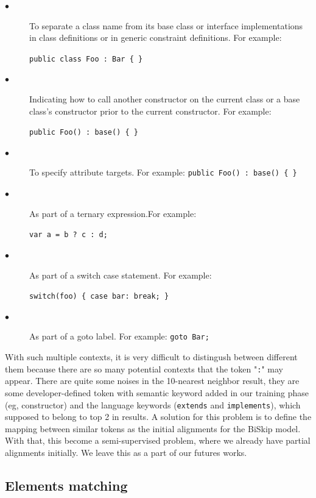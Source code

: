 \begin{description}
	\item [$\bullet$] To separate a class name from its base class or interface implementations in class definitions or in generic constraint definitions. For example: 
	
	\texttt{public class Foo : Bar \{ \}}
	\item [$\bullet$] Indicating how to call another constructor on the current class or a base class's constructor prior to the current constructor. For example: 
	
	\texttt{public Foo() : base() \{ \}}
	\item [$\bullet$] To specify attribute targets. For example: \texttt{public Foo() : base() \{ \}}
	\item [$\bullet$] As part of a ternary expression.For example:
	
 	\texttt{var a = b ? c : d;}
	\item [$\bullet$] As part of a switch case statement. For example:
	
	 \texttt{switch(foo) \{ case bar: break; \}}
	\item [$\bullet$] As part of a goto label. For example:
	\texttt{goto Bar;}

\end{description}

With such multiple contexts, it is very difficult to distingush between different them because there are so many potential contexts that the token "\texttt{:}" may appear. There are quite some noises in the 10-nearest neighbor result, they are some developer-defined token with semantic keyword added in our training phase (eg, constructor) and the language keywords (\texttt{extends} and \texttt{implements}), which supposed to belong to top 2 in results. A solution for this problem is to define the mapping between similar tokens as the initial alignments for the BiSkip model. With that, this become a semi-supervised problem, where we already have partial alignments initially. We leave this as a part of our futures works.

\subsection{Elements matching}

